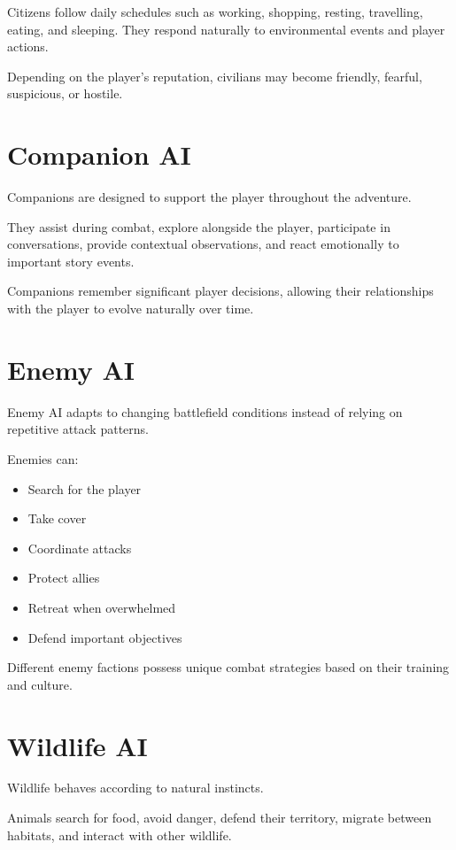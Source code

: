 Citizens follow daily schedules such as working, shopping, resting, travelling, eating, and sleeping. They respond naturally to environmental events and player actions.

Depending on the player's reputation, civilians may become friendly, fearful, suspicious, or hostile.

\section{Companion AI}

Companions are designed to support the player throughout the adventure.

They assist during combat, explore alongside the player, participate in conversations, provide contextual observations, and react emotionally to important story events.

Companions remember significant player decisions, allowing their relationships with the player to evolve naturally over time.

\section{Enemy AI}

Enemy AI adapts to changing battlefield conditions instead of relying on repetitive attack patterns.

Enemies can:

\begin{itemize}
    \item Search for the player
    \item Take cover
    \item Coordinate attacks
    \item Protect allies
    \item Retreat when overwhelmed
    \item Defend important objectives
\end{itemize}

Different enemy factions possess unique combat strategies based on their training and culture.

\section{Wildlife AI}

Wildlife behaves according to natural instincts.

Animals search for food, avoid danger, defend their territory, migrate between habitats, and interact with other wildlife.

